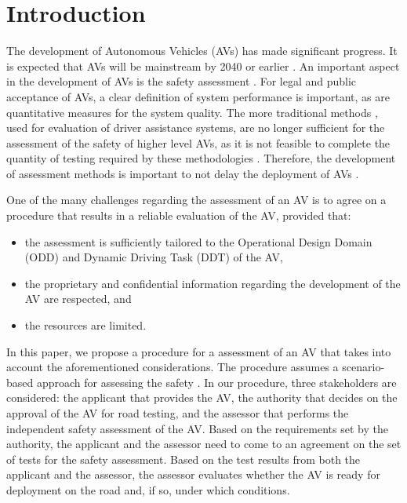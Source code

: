 \section{Introduction}
\label{sec:introduction}

The development of Autonomous Vehicles (AVs) has made significant progress. It is expected that AVs will be mainstream by 2040 \cite{madni2018autonomous} or earlier \cite{bimbraw2015autonomous}. 
An important aspect in the development of AVs is the safety assessment \cite{bengler2014threedecades, stellet2015taxonomy, Helmer2017safety, putz2017pegasus, wachenfeld2016release}. For legal and public acceptance of AVs, a clear definition of system performance is important, as are quantitative measures for the system quality. The more traditional methods \cite{ISO26262, response2006code}, used for evaluation of driver assistance systems, are no longer sufficient for the assessment of the safety of higher level AVs, as it is not feasible to complete the quantity of testing required by these methodologies \cite{wachenfeld2016release}. Therefore, the development of assessment methods is important to not delay the deployment of AVs \cite{bengler2014threedecades}.

One of the many challenges regarding the assessment of an AV \cite{koopman2016challenges} is to agree on a procedure that results in a reliable evaluation of the AV, provided that:
\begin{itemize}
	\item the assessment is sufficiently tailored to the Operational Design Domain (ODD) and Dynamic Driving Task (DDT) of the AV,
	\item the proprietary and confidential information regarding the development of the AV are respected, and
	\item the resources are limited. 
\end{itemize}
In this paper, we propose a procedure for a assessment of an AV that takes into account the aforementioned considerations. The procedure assumes a scenario-based approach for assessing the safety \cite{putz2017pegasus, winner2017pegasus, nhtsa2018framework}. In our procedure, three stakeholders are considered: the applicant that provides the AV, the authority that decides on the approval of the AV for road testing, and the assessor that performs the independent safety assessment of the AV. Based on the requirements set by the authority, the applicant and the assessor need to come to an agreement on the set of tests for the safety assessment. Based on the test results from both the applicant and the assessor, the assessor evaluates whether the AV is ready for deployment on the road and, if so, under which conditions.

